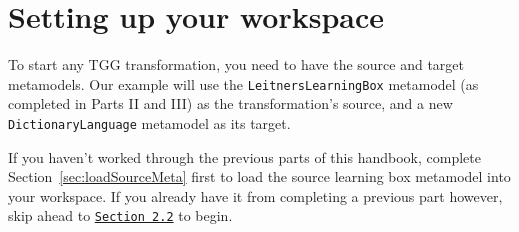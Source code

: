 \newpage
\section{Setting up your workspace}
\genHeader

To start any TGG transformation, you need to have the source and target metamodels. Our example will use the \texttt{LeitnersLearningBox} metamodel (as
completed in Parts II and III) as the transformation's source, and a new \texttt{DictionaryLanguage} metamodel as its target.

If you haven't worked through the previous parts of this handbook, complete Section~\ref{sec:loadSourceMeta} first to load the source learning box metamodel
into your workspace. If you already have it from completing a previous part however, skip ahead to
\texttt{\hyperlink{multiEAP}{Section 2.2}} to begin.




